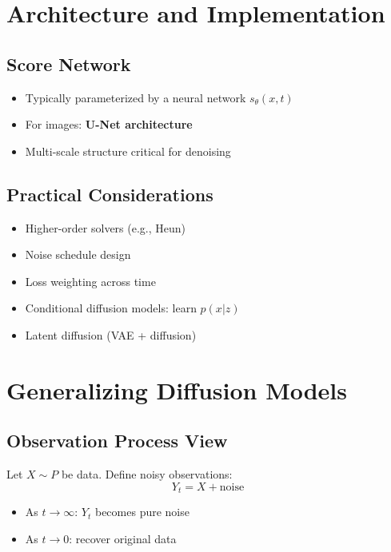 \documentclass[12pt,oneside]{book}
\numberwithin{equation}{section}
\theoremstyle{definition}
\theoremstyle{plain}
\theoremstyle{remark}
\begin{document}
\section{Architecture and Implementation}

\subsection{Score Network}

\begin{itemize}
    \item Typically parameterized by a neural network $s_\theta(x,t)$
    \item For images: \textbf{U-Net architecture}
    \item Multi-scale structure critical for denoising
\end{itemize}

\subsection{Practical Considerations}

\begin{itemize}
    \item Higher-order solvers (e.g., Heun)
    \item Noise schedule design
    \item Loss weighting across time
    \item Conditional diffusion models: learn $p(x|z)$
    \item Latent diffusion (VAE + diffusion)
\end{itemize}

\section{Generalizing Diffusion Models}

\subsection{Observation Process View}

Let $X \sim P$ be data. Define noisy observations:
\[
Y_t = X + \text{noise}
\]

\begin{itemize}
    \item As $t \to \infty$: $Y_t$ becomes pure noise
    \item As $t \to 0$: recover original data
\end{itemize}
\end{document}
